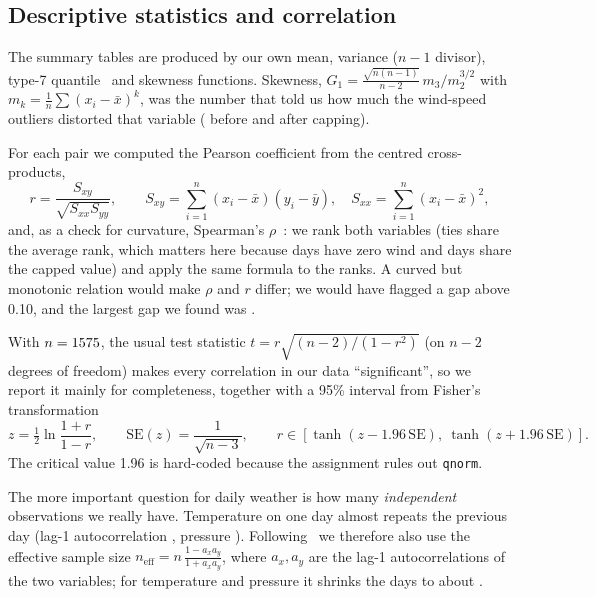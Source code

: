 \documentclass[11pt,a4paper]{article}
\begin{document}
\subsection{Descriptive statistics and correlation}
The summary tables are produced by our own mean, variance ($n-1$ divisor),
type-7 quantile~\cite{hyndman} and skewness functions. Skewness,
$G_1=\frac{\sqrt{n(n-1)}}{n-2}\,m_3/m_2^{3/2}$ with $m_k=\frac1n\sum(x_i-\bar x)^k$, was
the number that told us how much the wind-speed outliers distorted that variable
(\windSkewRaw{} before and \windSkewClean{} after capping).

For each pair we computed the Pearson coefficient from the centred cross-products,
\[
  r=\frac{S_{xy}}{\sqrt{S_{xx}S_{yy}}},\qquad
  S_{xy}=\sum_{i=1}^n (x_i-\bar x)(y_i-\bar y),\quad
  S_{xx}=\sum_{i=1}^n (x_i-\bar x)^2 ,
\]
and, as a check for curvature, Spearman's $\rho$~\cite{spearman}: we rank both
variables (ties share the average rank, which matters here because \nWindZero{}
days have zero wind and \nWindCapped{} days share the capped value) and apply the
same formula to the ranks. A curved but monotonic relation would make $\rho$ and
$r$ differ; we would have flagged a gap above 0.10, and the largest gap we found
was \maxRhoGap.

With $n=1575$, the usual test statistic $t=r\sqrt{(n-2)/(1-r^2)}$ (on $n-2$
degrees of freedom) makes every correlation in our data ``significant'', so we
report it mainly for completeness, together with a 95\% interval from Fisher's transformation~\cite{fisher}
\[
  z=\tfrac12\ln\frac{1+r}{1-r},\qquad \mathrm{SE}(z)=\frac{1}{\sqrt{n-3}},\qquad
  r\in\left[\tanh(z-1.96\,\mathrm{SE}),\ \tanh(z+1.96\,\mathrm{SE})\right].
\]
The critical value 1.96 is hard-coded because the assignment rules out \texttt{qnorm}.

The more important question for daily weather is how many \emph{independent}
observations we really have. Temperature on one day almost repeats the previous day
(lag-1 autocorrelation \acfT, pressure \acfP). Following~\cite{bartlett,bretherton} we
therefore also use the effective sample size
$n_{\mathrm{eff}}=n\,\frac{1-a_x a_y}{1+a_x a_y}$, where $a_x,a_y$ are the lag-1
autocorrelations of the two variables; for temperature and pressure it shrinks the
\nDays{} days to about \neffTP.
\end{document}
